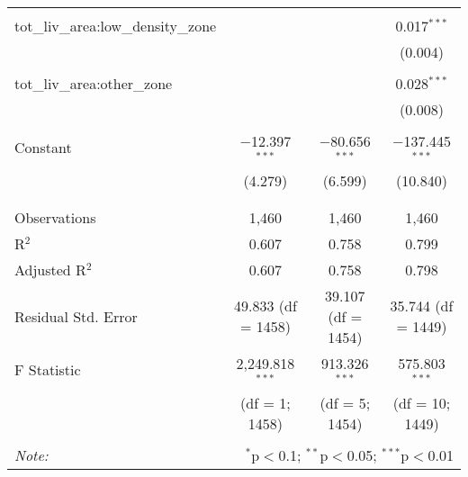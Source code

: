 \documentclass{article}
\begin{document}
\begin{table}[!htbp]
\begin{tabular}{@{\extracolsep{5pt}}lccc}
  & & & \\ 
 tot\_liv\_area:low\_density\_zone &  &  & 0.017$^{***}$ \\ 
  &  &  & (0.004) \\ 
  & & & \\ 
 tot\_liv\_area:other\_zone &  &  & 0.028$^{***}$ \\ 
  &  &  & (0.008) \\ 
  & & & \\ 
 Constant & $-$12.397$^{***}$ & $-$80.656$^{***}$ & $-$137.445$^{***}$ \\ 
  & (4.279) & (6.599) & (10.840) \\ 
  & & & \\ 
\hline \\[-1.8ex] 
Observations & 1,460 & 1,460 & 1,460 \\ 
R$^{2}$ & 0.607 & 0.758 & 0.799 \\ 
Adjusted R$^{2}$ & 0.607 & 0.758 & 0.798 \\ 
Residual Std. Error & 49.833 (df = 1458) & 39.107 (df = 1454) & 35.744 (df = 1449) \\ 
F Statistic & 2,249.818$^{***}$  & 913.326$^{***}$  & 575.803$^{***}$  \\ 
 & (df = 1; 1458) & (df = 5; 1454) & (df = 10; 1449) \\
\hline 
\hline \\[-1.8ex] 
\textit{Note:}  & \multicolumn{3}{r}{$^{*}$p$<$0.1; $^{**}$p$<$0.05; $^{***}$p$<$0.01} \\ 
\end{tabular} 
\end{table}
\end{document}
